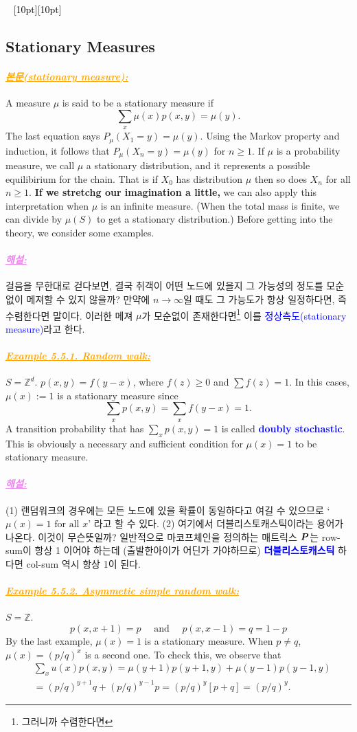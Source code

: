 \documentclass[12pt,oneside,english,a4paper]{article}
\newcommand{\dash}{\noindent \newline\textcolor{black}{\hrulefill~ \raisebox{-2.5pt}[10pt][10pt]{\leafright \decofourleft \decothreeleft  \aldineright \decotwo \floweroneleft \decoone   \floweroneright \decotwo \aldineleft\decothreeright \decofourright \leafleft} ~  \hrulefill}}
\newcommand{\paraviolet}[1]{\paragraph{\LARGE\textcolor{violet}{\it\underline{\textbf{#1:}}}}\LARGE}
\newcommand{\paraorange}[1]{\paragraph{\LARGE\textcolor{orange}{\it\underline{\textbf{#1:}}}}\LARGE}
\newcommand{\bs}[1]{\mbox{\boldmath $#1$}}
\begin{document}
\dash 

\subsection{Stationary Measures}
\paraorange{본문(stationary measure)} A measure $\mu$ is said to be a stationary measure if 
\[
\sum_x\mu(x)p(x,y)=\mu(y).
\]
The last equation says $P_{\mu}(X_1=y)=\mu(y)$. Using the Markov property and induction, it follows that $P_{\mu}(X_n=y)=\mu(y)$ for $n\geq 1$. If $\mu$ is a probability measure, we call $\mu$ a stationary distribution, and it represents a possible equilibirium for the chain. That is if $X_0$ has distribution $\mu$ then so does $X_n$ for all $n\geq 1$. \textbf{If we stretchg our imagination a little,} we can also apply this interpretation when $\mu$ is an infinite measure. (When the total mass is finite, we can divide by $\mu(S)$ to get a stationary distribution.) Before getting into the theory, we consider some examples. 

\paraviolet{해설} 걸음을 무한대로 걷다보면, 결국 취객이 어떤 노드에 있을지 그 가능성의 정도를 모순없이 메져할 수 있지 않을까? 만약에 $n\to \infty$일 때도 그 가능도가 항상 일정하다면, 즉 수렴한다면 말이다. 이러한 메져 $\mu$가 모순없이 존재한다면\footnote{그러니까 수렴한다면} 이를 \textcolor{blue}{정상측도(stationary measure)}라고 한다. 

\paraorange{Example 5.5.1. Random walk} $S=\mathbb{Z}^d$. $p(x,y)=f(y-x)$, where $f(z)\geq 0 $ and $\sum f(z)=1$. In this cases, $\mu(x):=1$ is a stationary measure since 
\[
\sum_xp(x,y)=\sum_xf(y-x)=1.
\]
A transition probability that has $\sum_xp(x,y)=1$ is called \textcolor{blue}{\bf doubly stochastic}. This is obviously a necessary and sufficient condition for $\mu(x)=1$ to be stationary measure. 

\paraviolet{해설} (1) 랜덤워크의 경우에는 모든 노드에 있을 확률이 동일하다고 여길 수 있으므로 `$\mu(x)=1 \mbox{ for all } x$' 라고 할 수 있다. (2) 여기에서 더블리스토캐스틱이라는 용어가 나온다. 이것이 무슨뜻일까? 일반적으로 마코프체인을 정의하는 매트릭스 $\bs P$는 row-sum이 항상 1 이어야 하는데 (출발한아이가 어딘가 가야하므로) \textcolor{blue}{\bf 더블리스토캐스틱} 하다면 col-sum 역시 항상 1이 된다. 

\paraorange{Example 5.5.2. Asymmetic simple random walk} $S=\mathbb{Z}.$
\[
p(x,x+1)=p \quad \mbox{ and } \quad p(x,x-1)=q=1-p
\]
By the last example, $\mu(x)=1$ is a stationary measure. When $p\neq q$, $\mu(x)=(p/q)^x$ is a second one. To check this, we observe that 
\begin{align*}
& \sum_xu(x)p(x,y)=\mu(y+1)p(y+1,y)+\mu(y-1)p(y-1,y) \\ 
& = (p/q)^{y+1}q+(p/q)^{y-1}p=(p/q)^y[p+q]=(p/q)^y.
\end{align*}
\end{document}
